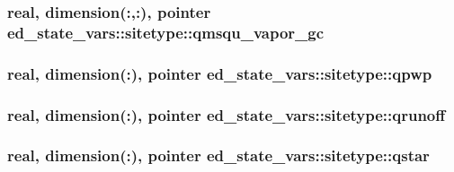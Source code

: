 \subsubsection[{\texorpdfstring{qmsqu\+\_\+vapor\+\_\+gc}{qmsqu_vapor_gc}}]{\setlength{\rightskip}{0pt plus 5cm}real, dimension(\+:,\+:), pointer ed\+\_\+state\+\_\+vars\+::sitetype\+::qmsqu\+\_\+vapor\+\_\+gc}\hypertarget{structed__state__vars_1_1sitetype_a180d82dd02981c2aa354b6f2f51e6008}{}\label{structed__state__vars_1_1sitetype_a180d82dd02981c2aa354b6f2f51e6008}
\subsubsection[{\texorpdfstring{qpwp}{qpwp}}]{\setlength{\rightskip}{0pt plus 5cm}real, dimension(\+:), pointer ed\+\_\+state\+\_\+vars\+::sitetype\+::qpwp}\hypertarget{structed__state__vars_1_1sitetype_a26da9e31405a959a191e3c202675e62a}{}\label{structed__state__vars_1_1sitetype_a26da9e31405a959a191e3c202675e62a}
\subsubsection[{\texorpdfstring{qrunoff}{qrunoff}}]{\setlength{\rightskip}{0pt plus 5cm}real, dimension(\+:), pointer ed\+\_\+state\+\_\+vars\+::sitetype\+::qrunoff}\hypertarget{structed__state__vars_1_1sitetype_a60b4460a57db2b2889aad624dee4ed82}{}\label{structed__state__vars_1_1sitetype_a60b4460a57db2b2889aad624dee4ed82}
\subsubsection[{\texorpdfstring{qstar}{qstar}}]{\setlength{\rightskip}{0pt plus 5cm}real, dimension(\+:), pointer ed\+\_\+state\+\_\+vars\+::sitetype\+::qstar}\hypertarget{structed__state__vars_1_1sitetype_a3e03350fd8351d10a574d27c957bc0b0}{}\label{structed__state__vars_1_1sitetype_a3e03350fd8351d10a574d27c957bc0b0}
